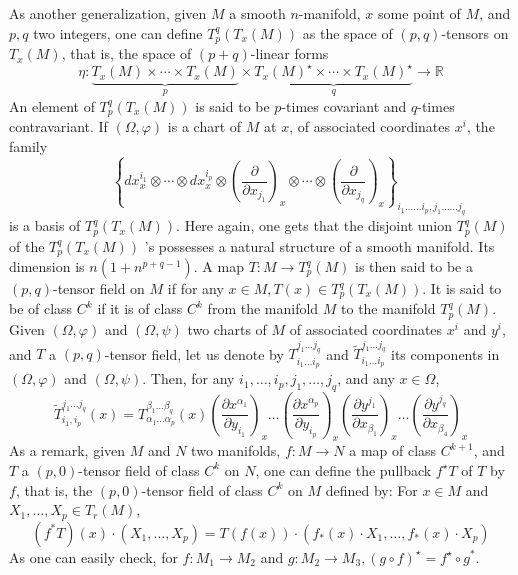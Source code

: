 \documentclass[12pt,hyperref,a4paper,UTF8]{ctexart}
\begin{document}
\vskip 3pt
As another generalization, given $M$ a smooth $n$-manifold, $x$ some point of $M$, and $p, q$ two integers, one can define $T_p^q\left(T_x(M)\right)$ as the space of $(p, q)$-tensors on $T_x(M)$, that is, the space of $(p+q)$-linear forms
$$
\eta: \underbrace{T_x(M) \times \cdots \times T_x(M)}_p \times \underbrace{T_x(M)^{\star} \times \cdots \times T_x(M)^{\star}}_q \rightarrow \mathbb{R}
$$
An element of $T_p^q\left(T_x(M)\right)$ is said to be $p$-times covariant and $q$-times contravariant. If $(\Omega, \varphi)$ is a chart of $M$ at $x$, of associated coordinates $x^i$, the family
$$
\qquad\qquad\left\{d x_x^{i_1} \otimes \cdots \otimes d x_x^{i_p} \otimes\left(\frac{\partial}{\partial x_{j_1}}\right)_x \otimes \cdots \otimes\left(\frac{\partial}{\partial x_{j_q}}\right)_x\right\}_{i_1 \ldots \ldots i_p, j_1 \ldots \ldots j_q}
$$
is a basis of $T_p^q\left(T_x(M)\right)$. Here again, one gets that the disjoint union $T_p^q(M)$ of the $T_p^q\left(T_x(M)\right)$ 's possesses a natural structure of a smooth manifold. Its dimension is $n\left(1+n^{p+q-1}\right)$. A map $T: M \rightarrow T_p^q(M)$ is then said to be a $(p, q)$-tensor field on $M$ if for any $x \in M, T(x) \in T_p^q\left(T_x(M)\right)$. It is said to be of class $C^k$ if it is of class $C^k$ from the manifold $M$ to the manifold $T_p^q(M)$. Given $(\Omega, \varphi)$ and $(\Omega, \psi)$ two charts of $M$ of associated coordinates $x^i$ and $y^i$, and $T$ a $(p, q)$-tensor field, let us
denote by $T_{i_1 \ldots i_p}^{j_1 \ldots j_q}$ and $\tilde{T}_{i_1 \ldots i_p}^{j_1 \ldots j_q}$ its components in $(\Omega, \varphi)$ and $(\Omega, \psi)$. Then, for any $i_1, \ldots, i_p, j_1, \ldots, j_q$, and any $x \in \Omega$,
$$
\tilde{T}_{i_1, i_p}^{j_1 \ldots j_q}(x)=T_{\alpha_1 \ldots \alpha_p}^{\beta_1 \ldots \beta_q}(x)\left(\frac{\partial x^{\alpha_1}}{\partial y_{i_1}}\right)_x \ldots\left(\frac{\partial x^{\alpha_p}}{\partial y_{i_p}}\right)_x\left(\frac{\partial y^{j_1}}{\partial x_{\beta_1}}\right)_x \ldots\left(\frac{\partial y^{j_q}}{\partial x_{\beta_4}}\right)_x
$$
As a remark, given $M$ and $N$ two manifolds, $f: M \rightarrow N$ a map of class $C^{k+1}$, and $T$ a $(p, 0)$-tensor field of class $C^k$ on $N$, one can define the pullback $f^{\star} T$ of $T$ by $f$, that is, the $(p, 0)$-tensor field of class $C^k$ on $M$ defined by: For $x \in M$ and $X_1, \ldots, X_p \in T_r(M)$,
$$
\left(f^* T\right)(x) \cdot\left(X_1, \ldots, X_p\right)=T(f(x)) \cdot\left(f_*(x) \cdot X_1, \ldots, f_*(x) \cdot X_p\right)
$$
As one can easily check, for $f: M_1 \rightarrow M_2$ and $g: M_2 \rightarrow M_3,(g \circ f)^{\star}=f^{\star} \circ g^*$.
\end{document}
